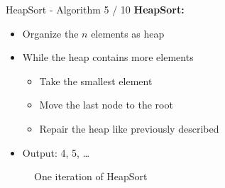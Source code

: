 \begin{frame}{HeapSort - Algorithm 5 / 10}
  \textbf{HeapSort:}
  \begin{itemize}
    \item
      Organize the {\color{Mittel-Blau}$n$} elements as heap
    \item
      While the heap contains more elements
      \begin{itemize}
        \item
          Take the smallest element
        \item
          Move the last node to the root
        \item
          Repair the heap like previously described
      \end{itemize}
    \item
      Output: {\color{Mittel-Gruen}4}, {\color{Mittel-Gruen}5},
      {\color{Mittel-Gruen}\ldots}
  \end{itemize}
  \vspace*{-0.5em}
  \begin{center}
    \begin{figure}[!h]%
      \begin{columns}%
        \begin{column}{0.33\textwidth}%
          \begin{centering}
            \begin{adjustbox}{height=8em}
            \end{adjustbox}%
          \end{centering}
        \end{column}%
        \begin{column}{0.33\textwidth}%
          \begin{centering}
            \begin{adjustbox}{height=8em}
            \end{adjustbox}%
          \end{centering}
        \end{column}%
        \begin{column}{0.33\textwidth}%
          \begin{centering}
            \begin{adjustbox}{height=8em}
            \end{adjustbox}%
          \end{centering}
        \end{column}%
      \end{columns}%
      \caption{One iteration of HeapSort}%
      \label{fig:heapsort_repair}%
    \end{figure}
  \end{center}
\end{frame}

